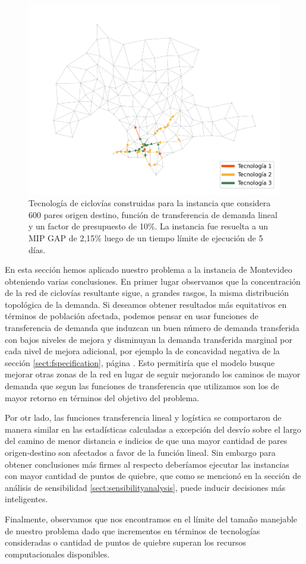 \begin{figure}[h!]
  \centering
  \includegraphics[width=12cm]{../resources/montevideo_d3000.0_linear_0.1_budget_factor_infras.png}
    \caption{Tecnología de ciclovías construidas para la instancia que considera 600 pares origen destino, función de transferencia de demanda lineal y un factor de presupuesto de 10\%. La instancia fue resuelta a un MIP GAP de 2,15\% luego de un tiempo límite de ejecución de 5 días.}
  \label{fig:montevideolowbudgetinstance}
\end{figure}

\clearpage
En esta sección hemos aplicado nuestro problema a la instancia de Montevideo obteniendo varias conclusiones. En primer lugar observamos que la concentración de la red de ciclovías resultante sigue, a grandes rasgos, la misma distribución topológica de la demanda. Si deseamos obtener resultados más equitativos en términos de población afectada, podemos pensar en usar funciones de transferencia de demanda que induzcan un buen número de demanda transferida con bajos niveles de mejora y disminuyan la demanda transferida marginal por cada nivel de mejora adicional, por ejemplo la de concavidad negativa de la sección \ref{sect:fspecification}, página \pageref{sect:fspecification}. Esto permitiría que el modelo busque mejorar otras zonas de la red en lugar de seguir mejorando los caminos de mayor demanda que segun las funciones de transferencia que utilizamos son los de mayor retorno en términos del objetivo del problema.

Por otr lado, las funciones transferencia lineal y logística se comportaron de manera similar en las estadísticas calculadas a excepción del desvío sobre el largo del camino de menor distancia e indicios de que una mayor cantidad de pares origen-destino son afectados a favor de la función lineal. Sin embargo para obtener conclusiones más firmes al respecto deberíamos ejecutar las instancias con mayor cantidad de puntos de quiebre, que como se mencionó en la sección de análisis de sensibilidad \ref{sect:sensibilityanalysis}, puede inducir decisiones más inteligentes.

Finalmente, observamos que nos encontramos en el límite del tamaño manejable de nuestro problema dado que incrementos en términos de tecnologías consideradas o cantidad de puntos de quiebre superan los recursos computacionales disponibles.
